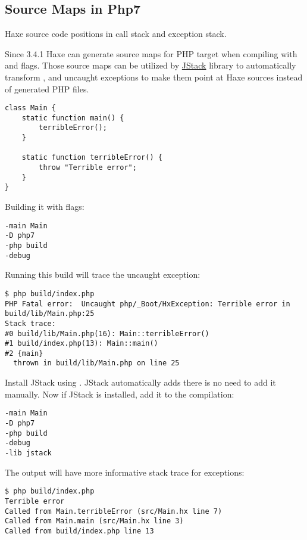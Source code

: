 \subsection{Source Maps in Php7}
\label{debugging-sourcemap-php7}

Haxe source code positions in call stack and exception stack.

Since 3.4.1 Haxe can generate source maps for PHP target when compiling with  and  flags.
Those source maps can be utilized by \href{https://lib.haxe.org/p/jstack/}{JStack} library to automatically transform ,  and uncaught exceptions to make them point at Haxe sources instead of generated PHP files.


\begin{lstlisting}
class Main {
	static function main() {
		terribleError();
	}

	static function terribleError() {
		throw "Terrible error";
	}
}
\end{lstlisting}

Building it with flags:

\begin{lstlisting}
-main Main
-D php7
-php build
-debug
\end{lstlisting}

Running this build will trace the uncaught exception:

\begin{lstlisting}
$ php build/index.php
PHP Fatal error:  Uncaught php/_Boot/HxException: Terrible error in build/lib/Main.php:25
Stack trace:
#0 build/lib/Main.php(16): Main::terribleError()
#1 build/index.php(13): Main::main()
#2 {main}
  thrown in build/lib/Main.php on line 25
\end{lstlisting}

Install JStack using . JStack automatically adds  there is no need to add it manually.
Now if JStack is installed, add it to the compilation:

\begin{lstlisting}
-main Main
-D php7
-php build
-debug
-lib jstack
\end{lstlisting}

The output will have more informative stack trace for exceptions:

\begin{lstlisting}
$ php build/index.php
Terrible error
Called from Main.terribleError (src/Main.hx line 7)
Called from Main.main (src/Main.hx line 3)
Called from build/index.php line 13
\end{lstlisting}
